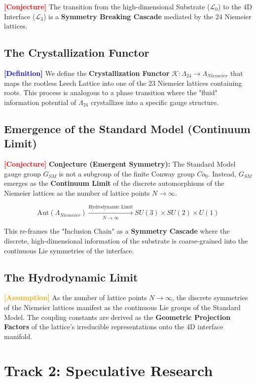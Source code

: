 \documentclass[11pt,titlepage]{article}
\newcommand{\substrate}{\mathcal{L}_0}
\newcommand{\interface}{\mathcal{L}_3}
\newcommand{\leech}{\Lambda_{24}}
\newcommand{\tagdef}{\textcolor{blue}{\textbf{[Definition]}} }
\newcommand{\tagass}{\textcolor{orange}{\textbf{[Assumption]}} }
\newcommand{\tagconj}{\textcolor{red}{\textbf{[Conjecture]}} }
\begin{document}
\label{sec:niemeier}
\tagconj The transition from the high-dimensional Substrate ($\substrate$) to the 4D Interface ($\interface$) is a \textbf{Symmetry Breaking Cascade} mediated by the 24 Niemeier lattices.

\subsection{The Crystallization Functor}
\tagdef We define the \textbf{Crystallization Functor} $\mathcal{K}: \leech \to \Lambda_{Niemeier}$ that maps the rootless Leech Lattice into one of the 23 Niemeier lattices containing roots. This process is analogous to a phase transition where the "fluid" information potential of $\leech$ crystallizes into a specific gauge structure.


\subsection{Emergence of the Standard Model (Continuum Limit)}
\tagconj \textbf{Conjecture (Emergent Symmetry):} The Standard Model gauge group $G_{SM}$ is not a subgroup of the finite Conway group $Co_0$. Instead, $G_{SM}$ emerges as the \textbf{Continuum Limit} of the discrete automorphisms of the Niemeier lattices as the number of lattice points $N \to \infty$.

\begin{equation}
\text{Aut}(\Lambda_{Niemeier}) \xrightarrow[N \to \infty]{\text{Hydrodynamic Limit}} SU(3) \times SU(2) \times U(1)
\end{equation}

This re-frames the "Inclusion Chain" as a \textbf{Symmetry Cascade} where the discrete, high-dimensional information of the substrate is coarse-grained into the continuous Lie symmetries of the interface.


\subsection{The Hydrodynamic Limit}
\tagass As the number of lattice points $N \to \infty$, the discrete symmetries of the Niemeier lattices manifest as the continuous Lie groups of the Standard Model. The coupling constants are derived as the \textbf{Geometric Projection Factors} of the lattice's irreducible representations onto the 4D interface manifold.

\section{Track 2: Speculative Research}
\end{document}
